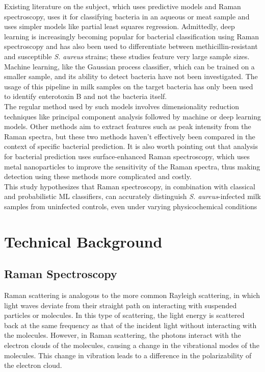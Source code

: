 \noindent Existing literature on the subject, which uses predictive models and Raman spectroscopy, uses it for classifying bacteria in an aqueous or meat sample and uses simpler models like partial least squares regression. \cite{Klein2023,Smith2024} Admittedly, deep learning is increasingly becoming popular for bacterial classification using Raman spectroscopy and has also been used to differentiate between methicillin-resistant and susceptible \textit{S. aureus} strains; these studies feature very large sample sizes. \cite{Ho2019}  Machine learning, like the Gaussian process classifier, which can be trained on a smaller sample, and its ability to detect bacteria have not been investigated. The usage of this pipeline in milk samples on the target bacteria has only been used to identify enterotoxin B and not the bacteria itself. \cite{DoeJRS6296} \\

\noindent The regular method used by such models involves dimensionality reduction techniques like principal component analysis followed by machine or deep learning models. Other methods aim to extract features such as peak intensity from the Raman spectra, but these two methods haven’t effectively been compared in the context of specific bacterial prediction. It is also worth pointing out that analysis for bacterial prediction uses surface-enhanced Raman spectroscopy, which uses metal nanoparticles to improve the sensitivity of the Raman spectra, thus making detection using these methods more complicated and costly. \cite{PubMed34653807} \\

\noindent This study hypothesizes that Raman spectroscopy, in combination with classical and probabilistic ML classifiers, can accurately distinguish \textit{S. aureus}-infected milk samples from uninfected controls, even under varying physicochemical conditions


\section{ Technical Background} \label{sec:setting}

\subsection{Raman Spectroscopy}

Raman scattering is analogous to the more common Rayleigh scattering, in which light waves deviate from their straight path on interacting with suspended particles or molecules. In this type of scattering, the light energy is scattered back at the same frequency as that of the incident light without interacting with the molecules. However, in Raman scattering, the photons interact with the electron clouds of the molecules, causing a change in the vibrational modes of the molecules. This change in vibration leads to a difference in the polarizability of the electron cloud. \cite{SciHub76e3755} \\

